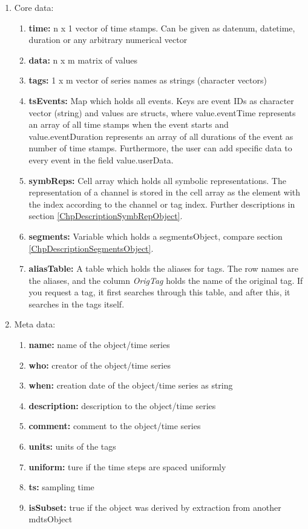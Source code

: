 \documentclass[a4]{scrreprt}
\begin{document}
\begin{enumerate}
	\item Core data:
	\begin{enumerate}	
		\item \textbf{time:} n x 1 vector of time stamps. Can be given as datenum, datetime, duration or any arbitrary numerical vector
		\item \textbf{data:} n x m matrix of values
		\item \textbf{tags:} 1 x m vector of series names as strings (character vectors)
		\item \textbf{tsEvents:} Map which holds all events. Keys are event IDs as character vector (string) and values are structs, where value.eventTime represents an array of all time stamps when the event starts and value.eventDuration represents an array of all durations of the event as number of time stamps. Furthermore, the user can add specific data to every event in the field value.userData.
		\item \textbf{symbReps:} Cell array which holds all symbolic representations. The representation of a channel is stored in the cell array as the element with the index according to the channel or tag index. Further descriptions in section \ref{ChpDescriptionSymbRepObject}.	
		\item \textbf{segments:} Variable which holds a segmentsObject, compare section \ref{ChpDescriptionSegmentsObject}.
		\item \textbf{aliasTable:} A table which holds the aliases for tags. The row names are the aliases, and the column \emph{OrigTag} holds the name of the original tag. If you request a tag, it first searches through this table, and after this, it searches in the tags itself.
	\end{enumerate}
	\item Meta data:
	\begin{enumerate}	
		\item \textbf{name:} name of the object/time series
		\item \textbf{who:} creator of the object/time series
		\item \textbf{when:} creation date of the object/time series as string
		\item \textbf{description:} description to the object/time series
		\item \textbf{comment:} comment to the object/time series    
		\item \textbf{units:} units of the tags
		\item \textbf{uniform:} ture if the time steps are spaced uniformly
		\item \textbf{ts:} sampling time
		\item \textbf{isSubset:} true if the object was derived by extraction from another mdtsObject
		

\end{enumerate}
\end{enumerate}
\end{document}
